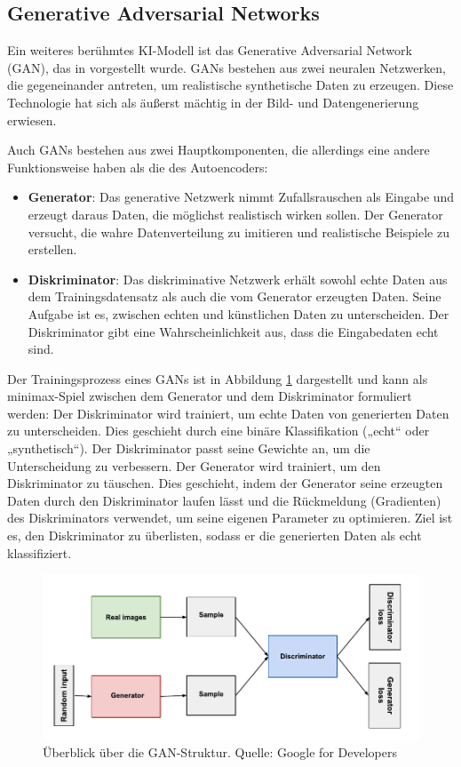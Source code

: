 \subsection{Generative Adversarial Networks} \label{sec:gan}

Ein weiteres berühmtes KI-Modell ist das Generative Adversarial Network (GAN), das in \parencite{Goodfellow2014gan} vorgestellt wurde. GANs bestehen aus zwei neuralen Netzwerken, die gegeneinander antreten, um realistische synthetische Daten zu erzeugen. Diese Technologie hat sich als äußerst mächtig in der Bild- und Datengenerierung erwiesen.

Auch GANs bestehen aus zwei Hauptkomponenten, die allerdings eine andere Funktionsweise haben als die des Autoencoders:

\begin{itemize}
	\item \textbf{Generator}: Das generative Netzwerk nimmt Zufallsrauschen als Eingabe und erzeugt daraus Daten, die möglichst realistisch wirken sollen. Der Generator versucht, die wahre Datenverteilung zu imitieren und realistische Beispiele zu erstellen.
	\item \textbf{Diskriminator}: Das diskriminative Netzwerk erhält sowohl echte Daten aus dem Trainingsdatensatz als auch die vom Generator erzeugten Daten. Seine Aufgabe ist es, zwischen echten und künstlichen Daten zu unterscheiden. Der Diskriminator gibt eine Wahrscheinlichkeit aus, dass die Eingabedaten echt sind.
\end{itemize}

Der Trainingsprozess eines GANs ist in Abbildung \ref{fig:gan} dargestellt und kann als minimax-Spiel zwischen dem Generator und dem Diskriminator formuliert werden: Der Diskriminator wird trainiert, um echte Daten von generierten Daten zu unterscheiden. Dies geschieht durch eine binäre Klassifikation („echt“ oder „synthetisch“). Der Diskriminator passt seine Gewichte an, um die Unterscheidung zu verbessern. Der Generator wird trainiert, um den Diskriminator zu täuschen. Dies geschieht, indem der Generator seine erzeugten Daten durch den Diskriminator laufen lässt und die Rückmeldung (Gradienten) des Diskriminators verwendet, um seine eigenen Parameter zu optimieren. Ziel ist es, den Diskriminator zu überlisten, sodass er die generierten Daten als echt klassifiziert.

\begin{figure}[h]
	\includegraphics[width=\textwidth]{figure_gan.pdf}
	\caption{Überblick über die GAN-Struktur. Quelle: Google for Developers}
	\label{fig:gan}
\end{figure}

